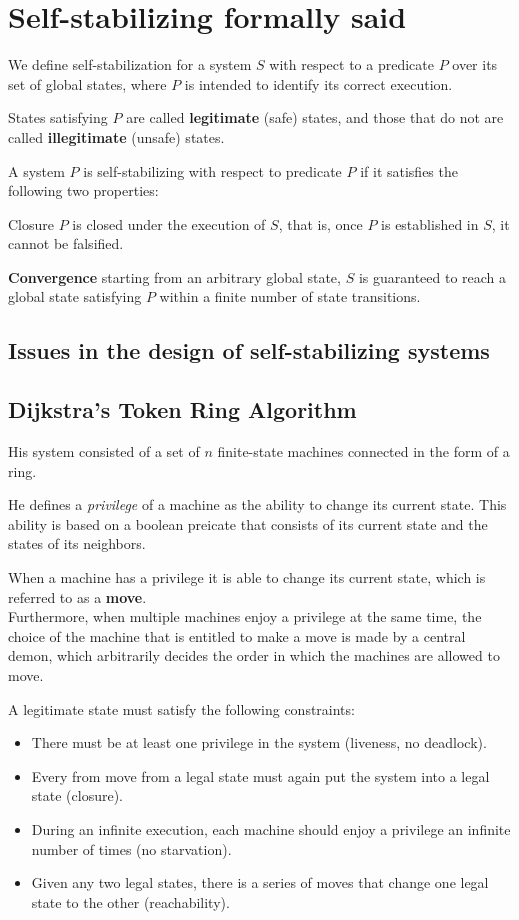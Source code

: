 \section{Self-stabilizing formally said}
We define self-stabilization for a system $S$ with respect to a predicate $P$ over its set of global states, where $P$ is intended to identify its correct execution.

States satisfying $P$ are called \textbf{legitimate} (safe) states, and those that do not are called \textbf{illegitimate} (unsafe) states.

A system $P$ is self-stabilizing with respect to predicate $P$ if it satisfies the following two properties:

Closure $P$ is closed under the execution of $S$, that is, once $P$ is established in $S$, it cannot be falsified.

\textbf{Convergence} starting from an arbitrary global state, $S$ is guaranteed to reach a global state satisfying $P$ within a finite number of state transitions.


\subsection{Issues in the design of self-stabilizing systems}

\subsection{Dijkstra's Token Ring Algorithm}
His system consisted of a set of $n$ finite-state machines connected in the form of a ring.

He defines a \textit{privilege} of a machine as the ability to change its current state.
This ability is based on a boolean preicate that consists of its current state and the states of its neighbors.

When a machine has a privilege it is able to change its current state, which is referred to as a \textbf{move}.\\
Furthermore, when multiple machines enjoy a privilege at the same time, the choice of the machine that is entitled to make a move is made by a central demon, which arbitrarily decides the order in which the machines are allowed to move.

A legitimate state must satisfy the following constraints:
\begin{itemize}
   \item There must be at least one privilege in the system (liveness, no deadlock).
   \item Every from move from a legal state must again put the system into a legal state (closure).
   \item During an infinite execution, each machine should enjoy a privilege an infinite number of times (no starvation).
   \item Given any two legal states, there is a series of moves that change one legal state to the other (reachability).
\end{itemize}

